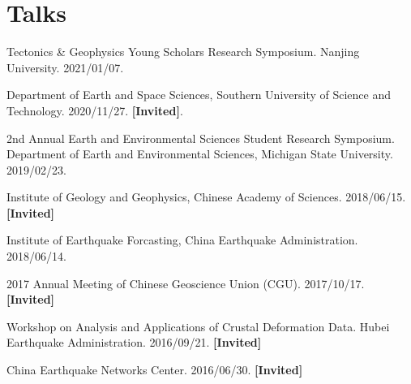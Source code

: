 \section{Talks}

\newcommand{\Invited}{\textbf{[Invited]}}

\begin{etaremune}
\item
    Tectonics \& Geophysics Young Scholars Research Symposium.
    Nanjing University.
    2021/01/07.
\item
    Department of Earth and Space Sciences, Southern University of Science and Technology.
    2020/11/27.
    \Invited.
\item
    2nd Annual Earth and Environmental Sciences Student Research Symposium.
    Department of Earth and Environmental Sciences, Michigan State University.
    2019/02/23.
\item
    Institute of Geology and Geophysics, Chinese Academy of Sciences.
    2018/06/15.
    \Invited
\item
    Institute of Earthquake Forcasting, China Earthquake Administration.
    2018/06/14.
\item
    2017 Annual Meeting of Chinese Geoscience Union (CGU).
    2017/10/17.
    \Invited
\item
    Workshop on Analysis and Applications of Crustal Deformation Data.
    Hubei Earthquake Administration.
    2016/09/21.
    \Invited
\item
    China Earthquake Networks Center.
    2016/06/30.
    \Invited
\end{etaremune}
